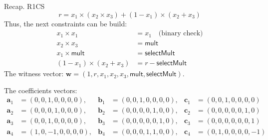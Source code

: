 \documentclass{zkdl-presentation-template}
\begin{document}
    \begin{frame}{Recap. R1CS}
        \vspace{-10pt}
        \begin{equation*}
            r = x_1 \times (x_2 \times x_3) + (1 - x_1) \times (x_2 + x_3)
        \end{equation*}\pause
        Thus, the next constraints can be build:
        \vspace{-5pt}
        \begin{align*}
            x_1 \times x_1 &= x_1 \quad \text{(binary check)} \tag{1} \\
            x_2 \times x_3 &= \mathsf{mult} \tag{2} \\
            x_1 \times \mathsf{mult} &= \mathsf{selectMult} \tag{3} \\
            (1 - x_1) \times (x_2 + x_3) &= r - \mathsf{selectMult} \tag{4}
        \end{align*}\pause
        The witness vector: $\boldsymbol{w} = (1, r, x_1, x_2, x_3, \mathsf{mult}, \mathsf{selectMult})$.
        
        \vspace{2pt}\pause
        The coefficients vectors:
        \vspace{-25pt}
        {\center\small\begin{align*}
            \boldsymbol{a}_1 &= (0, 0, 1, 0, 0, 0, 0), & \boldsymbol{b}_1 &= (0, 0, 1, 0, 0, 0, 0), & \boldsymbol{c}_1 &= (0, 0, 1, 0, 0, 0, 0) \\
            \boldsymbol{a}_2 &= (0, 0, 0, 1, 0, 0, 0), & \boldsymbol{b}_2 &= (0, 0, 0, 0, 1, 0, 0), & \boldsymbol{c}_2 &= (0, 0, 0, 0, 0, 1, 0) \\
            \boldsymbol{a}_3 &= (0, 0, 1, 0, 0, 0, 0), & \boldsymbol{b}_3 &= (0, 0, 0, 0, 0, 1, 0), & \boldsymbol{c}_3 &= (0, 0, 0, 0, 0, 0, 1) \\
            \boldsymbol{a}_4 &= (1, 0, -1, 0, 0, 0, 0), & \boldsymbol{b}_4 &= (0, 0, 0, 1, 1, 0, 0), & \boldsymbol{c}_4 &= (0, 1, 0, 0, 0, 0, -1)
        \end{align*}}
    \end{frame}
    
\end{document}
